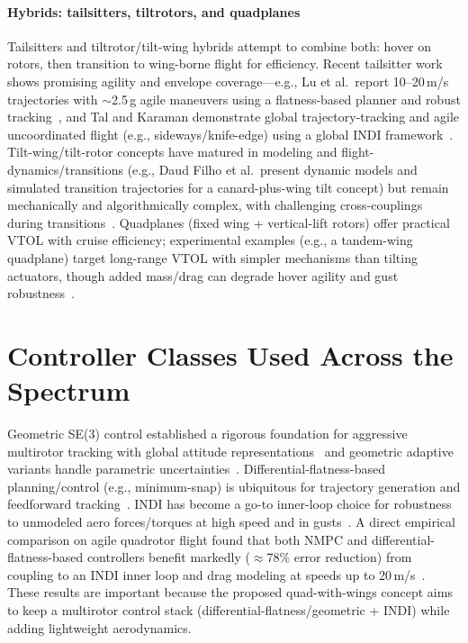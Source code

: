 \paragraph{Hybrids: tailsitters, tiltrotors, and quadplanes}
Tailsitters and tiltrotor/tilt-wing hybrids attempt to combine both: hover on rotors, then transition to wing-borne flight for efficiency.
Recent tailsitter work shows promising agility and envelope coverage---e.g., Lu et al.\ report 10--20\,m/s trajectories with $\sim$2.5\,g agile maneuvers using a flatness-based planner and robust tracking~\cite{Lu2022}, and Tal and Karaman demonstrate global trajectory-tracking and agile uncoordinated flight (e.g., sideways/knife-edge) using a global INDI framework~\cite{Tal2021Tailsitter,Tal2022Global}.
Tilt-wing/tilt-rotor concepts have matured in modeling and flight-dynamics/transitions (e.g., Daud Filho et al.\ present dynamic models and simulated transition trajectories for a canard-plus-wing tilt concept) but remain mechanically and algorithmically complex, with challenging cross-couplings during transitions~\cite{DaudFilho2024,Misra2022}.
Quadplanes (fixed wing + vertical-lift rotors) offer practical VTOL with cruise efficiency; experimental examples (e.g., a tandem-wing quadplane) target long-range VTOL with simpler mechanisms than tilting actuators, though added mass/drag can degrade hover agility and gust robustness~\cite{Okulski2022}.


\section{Controller Classes Used Across the Spectrum}

Geometric SE(3) control established a rigorous foundation for aggressive multirotor tracking with global attitude representations~\cite{Lee2010} and geometric adaptive variants handle parametric uncertainties~\cite{Goodarzi2015}.
Differential-flatness-based planning/control (e.g., minimum-snap) is ubiquitous for trajectory generation and feedforward tracking~\cite{Mellinger2011,Tal2018}.
INDI has become a go-to inner-loop choice for robustness to unmodeled aero forces/torques at high speed and in gusts~\cite{Sieberling2010,Smeur2017}.
A direct empirical comparison on agile quadrotor flight found that both NMPC and differential-flatness-based controllers benefit markedly ($\approx$78\% error reduction) from coupling to an INDI inner loop and drag modeling at speeds up to 20\,m/s~\cite{Sun2021}.
These results are important because the proposed quad-with-wings concept aims to keep a multirotor control stack (differential-flatness/geometric + INDI) while adding lightweight aerodynamics.


